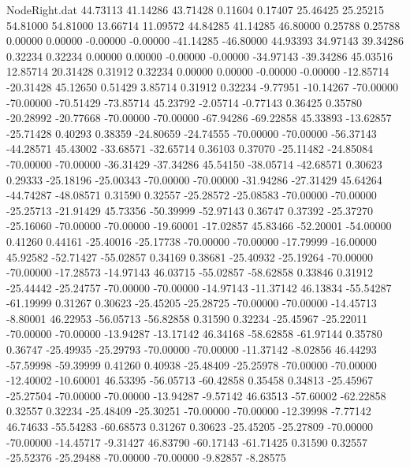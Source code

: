 \begin{filecontents}{NodeRight.dat}
  44.73113   41.14286   43.71428     0.11604    0.17407   25.46425   25.25215   54.81000   54.81000   13.66714   11.09572
  44.84285   41.14285   46.80000     0.25788    0.25788    0.00000    0.00000   -0.00000   -0.00000  -41.14285  -46.80000
  44.93393   34.97143   39.34286     0.32234    0.32234    0.00000    0.00000   -0.00000   -0.00000  -34.97143  -39.34286
  45.03516   12.85714   20.31428     0.31912    0.32234    0.00000    0.00000   -0.00000   -0.00000  -12.85714  -20.31428
  45.12650    0.51429    3.85714     0.31912    0.32234   -9.77951  -10.14267  -70.00000  -70.00000  -70.51429  -73.85714
  45.23792   -2.05714   -0.77143     0.36425    0.35780  -20.28992  -20.77668  -70.00000  -70.00000  -67.94286  -69.22858
  45.33893  -13.62857  -25.71428     0.40293    0.38359  -24.80659  -24.74555  -70.00000  -70.00000  -56.37143  -44.28571
  45.43002  -33.68571  -32.65714     0.36103    0.37070  -25.11482  -24.85084  -70.00000  -70.00000  -36.31429  -37.34286
  45.54150  -38.05714  -42.68571     0.30623    0.29333  -25.18196  -25.00343  -70.00000  -70.00000  -31.94286  -27.31429
  45.64264  -44.74287  -48.08571     0.31590    0.32557  -25.28572  -25.08583  -70.00000  -70.00000  -25.25713  -21.91429
  45.73356  -50.39999  -52.97143     0.36747    0.37392  -25.37270  -25.16060  -70.00000  -70.00000  -19.60001  -17.02857
  45.83466  -52.20001  -54.00000     0.41260    0.44161  -25.40016  -25.17738  -70.00000  -70.00000  -17.79999  -16.00000
  45.92582  -52.71427  -55.02857     0.34169    0.38681  -25.40932  -25.19264  -70.00000  -70.00000  -17.28573  -14.97143
  46.03715  -55.02857  -58.62858     0.33846    0.31912  -25.44442  -25.24757  -70.00000  -70.00000  -14.97143  -11.37142
  46.13834  -55.54287  -61.19999     0.31267    0.30623  -25.45205  -25.28725  -70.00000  -70.00000  -14.45713   -8.80001
  46.22953  -56.05713  -56.82858     0.31590    0.32234  -25.45967  -25.22011  -70.00000  -70.00000  -13.94287  -13.17142
  46.34168  -58.62858  -61.97144     0.35780    0.36747  -25.49935  -25.29793  -70.00000  -70.00000  -11.37142   -8.02856
  46.44293  -57.59998  -59.39999     0.41260    0.40938  -25.48409  -25.25978  -70.00000  -70.00000  -12.40002  -10.60001
  46.53395  -56.05713  -60.42858     0.35458    0.34813  -25.45967  -25.27504  -70.00000  -70.00000  -13.94287   -9.57142
  46.63513  -57.60002  -62.22858     0.32557    0.32234  -25.48409  -25.30251  -70.00000  -70.00000  -12.39998   -7.77142
  46.74633  -55.54283  -60.68573     0.31267    0.30623  -25.45205  -25.27809  -70.00000  -70.00000  -14.45717   -9.31427
  46.83790  -60.17143  -61.71425     0.31590    0.32557  -25.52376  -25.29488  -70.00000  -70.00000   -9.82857   -8.28575

\end{filecontents}
